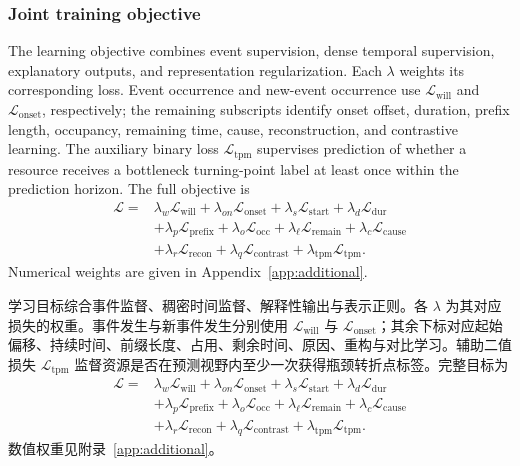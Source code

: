 \documentclass[a4paper,fleqn]{cas-dc}
\newcommand{\zhpara}[1]{%
  \par\begingroup\small\color{black!72}\noindent #1\par\endgroup}
\begin{document}
\subsubsection{Joint training objective}\label{sec:joint-optimization}

The learning objective combines event supervision, dense temporal supervision, explanatory outputs, and representation regularization. Each $\lambda$ weights its corresponding loss. Event occurrence and new-event occurrence use $\mathcal{L}_{\mathrm{will}}$ and $\mathcal{L}_{\mathrm{onset}}$, respectively; the remaining subscripts identify onset offset, duration, prefix length, occupancy, remaining time, cause, reconstruction, and contrastive learning. The auxiliary binary loss $\mathcal{L}_{\mathrm{tpm}}$ supervises prediction of whether a resource receives a bottleneck turning-point label at least once within the prediction horizon. The full objective is
\begin{equation}
\begin{aligned}
\mathcal{L}={}&
\lambda_w\mathcal{L}_{\mathrm{will}}+
\lambda_{on}\mathcal{L}_{\mathrm{onset}}+
\lambda_s\mathcal{L}_{\mathrm{start}}+
\lambda_d\mathcal{L}_{\mathrm{dur}}\\
&+\lambda_p\mathcal{L}_{\mathrm{prefix}}+
\lambda_o\mathcal{L}_{\mathrm{occ}}+
\lambda_{\ell}\mathcal{L}_{\mathrm{remain}}+
\lambda_c\mathcal{L}_{\mathrm{cause}}\\
&+\lambda_r\mathcal{L}_{\mathrm{recon}}+
\lambda_q\mathcal{L}_{\mathrm{contrast}}+
\lambda_{\mathrm{tpm}}\mathcal{L}_{\mathrm{tpm}} .
\end{aligned}
\end{equation}
Numerical weights are given in Appendix~\ref{app:additional}.

\zhpara{学习目标综合事件监督、稠密时间监督、解释性输出与表示正则。各 $\lambda$ 为其对应损失的权重。事件发生与新事件发生分别使用 $\mathcal{L}_{\mathrm{will}}$ 与 $\mathcal{L}_{\mathrm{onset}}$；其余下标对应起始偏移、持续时间、前缀长度、占用、剩余时间、原因、重构与对比学习。辅助二值损失 $\mathcal{L}_{\mathrm{tpm}}$ 监督资源是否在预测视野内至少一次获得瓶颈转折点标签。完整目标为
\begin{equation}
\begin{aligned}
\mathcal{L}={}&
\lambda_w\mathcal{L}_{\mathrm{will}}+
\lambda_{on}\mathcal{L}_{\mathrm{onset}}+
\lambda_s\mathcal{L}_{\mathrm{start}}+
\lambda_d\mathcal{L}_{\mathrm{dur}}\\
&+\lambda_p\mathcal{L}_{\mathrm{prefix}}+
\lambda_o\mathcal{L}_{\mathrm{occ}}+
\lambda_{\ell}\mathcal{L}_{\mathrm{remain}}+
\lambda_c\mathcal{L}_{\mathrm{cause}}\\
&+\lambda_r\mathcal{L}_{\mathrm{recon}}+
\lambda_q\mathcal{L}_{\mathrm{contrast}}+
\lambda_{\mathrm{tpm}}\mathcal{L}_{\mathrm{tpm}} .
\end{aligned}
\end{equation}
数值权重见附录~\ref{app:additional}。}
\end{document}
